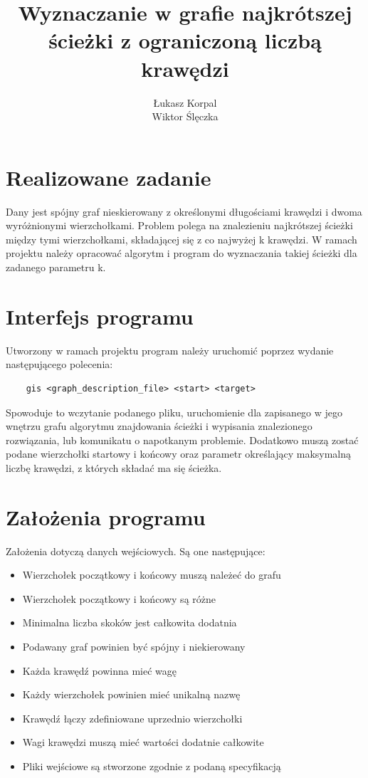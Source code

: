 \documentclass[a4paper, 12pt]{article}
\author{Łukasz Korpal \\ Wiktor Ślęczka}
\title{Wyznaczanie w grafie najkrótszej ścieżki z ograniczoną liczbą krawędzi}
\begin{document}
	\sloppy
	\maketitle
	\newpage
	\tableofcontents
	\newpage
	\section{Realizowane zadanie}
	Dany jest spójny graf nieskierowany z określonymi długościami krawędzi i dwoma wyróżnionymi wierzchołkami. Problem polega na znalezieniu najkrótszej ścieżki między tymi wierzchołkami, składającej się z co najwyżej k krawędzi. W ramach projektu należy opracować algorytm i program do wyznaczania takiej ścieżki dla zadanego parametru k.
	
	\section{Interfejs programu}
	Utworzony w ramach projektu program należy uruchomić poprzez wydanie następującego polecenia:
	\begin{verbatim}
	gis <graph_description_file> <start> <target>
	\end{verbatim}
	Spowoduje to wczytanie podanego pliku, uruchomienie dla zapisanego w jego wnętrzu grafu algorytmu znajdowania ścieżki i wypisania znalezionego rozwiązania, lub komunikatu o napotkanym problemie. Dodatkowo muszą zostać podane wierzchołki startowy i końcowy oraz parametr określający maksymalną liczbę krawędzi, z których składać ma się ścieżka.
	\section{Założenia programu}
	Założenia dotyczą danych wejściowych. Są one następujące:
	\begin{itemize}
		\item Wierzchołek początkowy i końcowy muszą należeć do grafu
		\item Wierzchołek początkowy i końcowy są różne
		\item Minimalna liczba skoków jest całkowita dodatnia
		\item Podawany graf powinien być spójny i niekierowany
		\item Każda krawędź powinna mieć  wagę
		\item Każdy wierzchołek powinien mieć unikalną nazwę
		\item Krawędź łączy zdefiniowane uprzednio wierzchołki
		\item Wagi krawędzi muszą mieć wartości dodatnie całkowite
		\item Pliki wejściowe są stworzone zgodnie z podaną specyfikacją
	\end{itemize}
	
\end{document}
